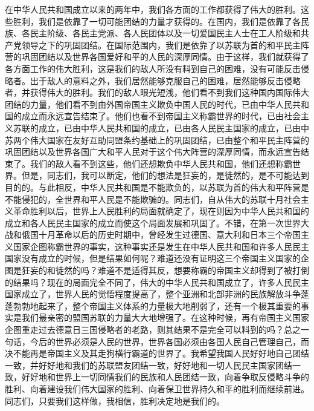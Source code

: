 在中华人民共和国成立以来的两年中，我们各方面的工作都获得了伟大的胜利。这些胜利，我们是依靠了一切可能团结的力量才获得的。在国内，我们是依靠了各民族、各民主阶级、各民主党派、各人民团体以及一切爱国民主人士在工人阶级和共产党领导之下的巩固团结。在国际范围内，我们是依靠了以苏联为首的和平民主阵营的巩固团结以及世界各国爱好和平的人民的深厚同情。由于这样，我们就获得了各方面工作的伟大胜利，这是我们的敌人所没有料到自己的困难，没有可能反击侵略者。出于敌人的意料之外，我们居然能够克服自己的困难，居然能够反击侵略者，并获得伟大的胜利。我们的敌人眼光短浅，他们看不到我们这种国内国际伟大团结的力量，他们看不到由外国帝国主义欺负中国人民的时代，已由中华人民共和国的成立而永远宣告结束了。他们也看不到帝国主义称霸世界的时代，已由社会主义苏联的成立，已由中华人民共和国的成立，已由各人民民主国家的成立，已由中苏两个伟大国家在友好互助同盟条约基础上的巩固团结，已由整个和平民主阵营的巩固团结以及世界各国广大和平人民对于这个伟大阵营的深厚同情，而永远宣告结束了。我们的敌人看不到这些，他们还想欺负中华人民共和国，他们还想称霸世界。但是，同志们，我可以断定，他们的想法是狂妄的，是徒然的，是不可能达到目的的。与此相反，中华人民共和国是不能欺负的，以苏联为首的伟大和平阵营是不能侵犯的，全世界和平人民是不能欺骗的。同志们，自从伟大的苏联十月社会主义革命胜利以后，世界上人民胜利的局面就确定了，现在则因为中华人民共和国的成立和各人民民主国家的成立而使这个局面发展和巩固了。不错，在第一次世界大战和俄国十月革命以后的历史时期中，曾经发生过德国、意大利和日本三个帝国主义国家企图称霸世界的事实，这种事实还是发生在中华人民共和国和许多人民民主国家没有成立的时候，但是结果如何呢？难道还没有证明这三个帝国主义国家的企图是狂妄的和徒然的吗？难道不是适得其反，想要称霸的帝国主义却得到了被打倒的结果吗？现在的局面完全不同了，伟大的中华人民共和国成立了，许多人民民主国家成立了，世界人民的觉悟程度提高了，整个亚洲和北部非洲的民族解放斗争蓬蓬勃勃地起来了，整个帝国主义体系的力量极大地削弱了，还有一个极其重要的事实是我们最亲密的盟国苏联的力量大大地增强了。在这种时候，再有帝国主义国家企图重走过去德意日三国侵略者的老路，则其结果不是完全可以料到的吗？总之一句话，今后的世界必须是人民的世界，世界各国必须由各国人民自己管理自己，而决不能再是帝国主义及其走狗横行霸道的世界了。我希望我国人民好好地自己团结一致，并好好地和我们的苏联盟友团结一致，好好地和一切人民民主国家团结一致，好好地和世界上一切同情我们的民族和人民团结一致，向着争取反侵略斗争的胜利、向着建设我们伟大国家的胜利、向着保卫世界持久和平的胜利而继续前进。同志们，只要我们这样做，我相信，胜利决定地是我们的。
